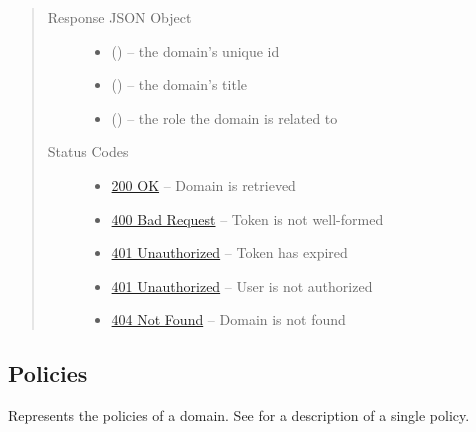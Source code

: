 \documentclass[letterpaper,10pt,english]{sphinxmanual}
\begin{document}
\begin{fulllineitems}
\begin{quote}
\begin{description}
\begin{itemize}
\end{itemize}

\item[{Response JSON Object}] \leavevmode\begin{itemize}
\item {} 
 () -- the domain's unique id

\item {} 
 () -- the domain's title

\item {} 
 () -- the role the domain is related to

\end{itemize}

\item[{Status Codes}] \leavevmode\begin{itemize}
\item {} 
\href{http://www.w3.org/Protocols/rfc2616/rfc2616-sec10.html\#sec10.2.1}{200 OK} -- Domain is retrieved

\item {} 
\href{http://www.w3.org/Protocols/rfc2616/rfc2616-sec10.html\#sec10.4.1}{400 Bad Request} -- Token is not well-formed

\item {} 
\href{http://www.w3.org/Protocols/rfc2616/rfc2616-sec10.html\#sec10.4.2}{401 Unauthorized} -- Token has expired

\item {} 
\href{http://www.w3.org/Protocols/rfc2616/rfc2616-sec10.html\#sec10.4.2}{401 Unauthorized} -- User is not authorized

\item {} 
\href{http://www.w3.org/Protocols/rfc2616/rfc2616-sec10.html\#sec10.4.5}{404 Not Found} -- Domain is not found

\end{itemize}

\end{description}\end{quote}

\end{fulllineitems}



\subsection{Policies}
\label{\detokenize{resources/domain:policies}}
Represents the policies of a domain. See {\hyperref[\detokenize{resources/policy:policy}]{}} for a description of a single policy.
\end{document}
